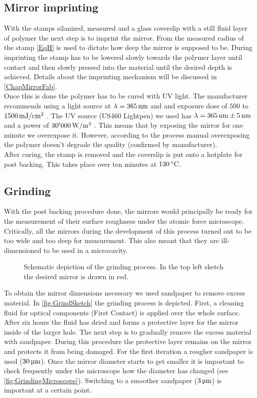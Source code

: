 \subsection{Mirror imprinting}
With the stamps silanized, measured and a glass coverslip with a still fluid layer of polymer the next step is to imprint the mirror. From the measured radius of the stamp \autoref{EqH} is used to dictate how deep the mirror is supposed to be. During imprinting the stamp has to be lowered slowly towards the polymer layer until contact and then slowly pressed into the material until the desired depth is achieved. Details about the imprinting mechanism will be discussed in \autoref{ChapMirrorFab}.\\
Once this is done the polymer has to be cured with UV light. The manufacturer recommends using a light source at $\lambda=365\nm$ and and exposure dose of $500$ to $1500 \mJcm$ \cite{ormocompProcess}. The UV source (US460 Lightpen) we used has $\lambda = 365\nm \pm 5\nm$ and a power of $30'000\Wm$ \cite{us460ds}. This means that by exposing the mirror for one minute we overexpose it. However, according to the process manual overexposing the polymer doesn't degrade the quality (confirmed by manufacturer).\\
After curing, the stamp is removed and the coverslip is put onto a hotplate for post backing. This takes place over ten minutes at $130\degrees$.

\subsection{Grinding}\label{ChapGrinding}
With the post backing procedure done, the mirrors would principally be ready for the measurement of their surface roughness under the atomic force microscope. Critically, all the mirrors during the development of this process turned out to be too wide and too deep for measurement. This also meant that they are ill-dimensioned to be used in a microcavity.

\begin{figure}[H]
	
	\caption{Schematic depiction of the grinding process. In the top left sketch the desired mirror is drawn in red.}
	\label{fig:GrindSketch}
\end{figure}

To obtain the mirror dimensions necessary we used sandpaper to remove excess material. In \autoref{fig:GrindSketch} the grinding process is depicted. First, a cleaning fluid for optical components (First Contact) is applied over the whole surface. After six hours the fluid has dried and forms a protective layer for the mirror inside of the larger hole. The next step is to gradually remove the excess material with sandpaper. During this procedure the protective layer remains on the mirror and protects it from being damaged. For the first iteration a rougher sandpaper is used ($30\um$). Once the mirror diameter starts to get smaller it is important to check frequently under the microscope how the diameter has changed (see \autoref{fig:GrindingMicroscope}). Switching to a smoother sandpaper ($3\um$) is important at a certain point.

